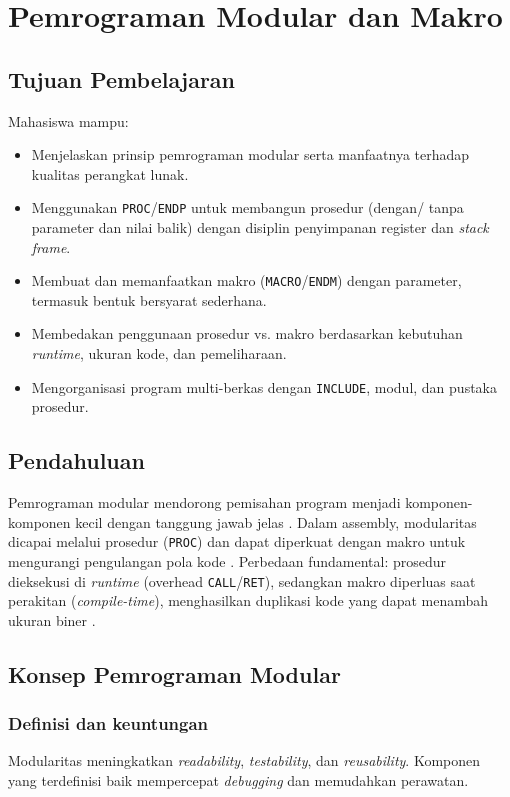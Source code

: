 \chapter{Pemrograman Modular dan Makro}

\section{Tujuan Pembelajaran}
Mahasiswa mampu:
\begin{itemize}
    \item Menjelaskan prinsip pemrograman modular serta manfaatnya terhadap kualitas perangkat lunak.
    \item Menggunakan \texttt{PROC}/\texttt{ENDP} untuk membangun prosedur (dengan/ tanpa parameter dan nilai balik) dengan disiplin penyimpanan register dan \textit{stack frame}.
    \item Membuat dan memanfaatkan makro (\texttt{MACRO}/\texttt{ENDM}) dengan parameter, termasuk bentuk bersyarat sederhana.
    \item Membedakan penggunaan prosedur vs. makro berdasarkan kebutuhan \textit{runtime}, ukuran kode, dan pemeliharaan.
    \item Mengorganisasi program multi-berkas dengan \texttt{INCLUDE}, modul, dan pustaka prosedur.
\end{itemize}

\section{Pendahuluan}
Pemrograman modular mendorong pemisahan program menjadi komponen-komponen kecil dengan tanggung jawab jelas \cite{susanto1995belajar}. Dalam assembly, modularitas dicapai melalui prosedur (\texttt{PROC}) dan dapat diperkuat dengan makro untuk mengurangi pengulangan pola kode \cite{hyde2010art}. Perbedaan fundamental: prosedur dieksekusi di \textit{runtime} (overhead \texttt{CALL}/\texttt{RET}), sedangkan makro diperluas saat perakitan (\textit{compile-time}), menghasilkan duplikasi kode yang dapat menambah ukuran biner \cite{nopi2003tutorial}.

\section{Konsep Pemrograman Modular}
\subsection{Definisi dan keuntungan}
Modularitas meningkatkan \textit{readability}, \textit{testability}, dan \textit{reusability}. Komponen yang terdefinisi baik mempercepat \textit{debugging} dan memudahkan perawatan.

